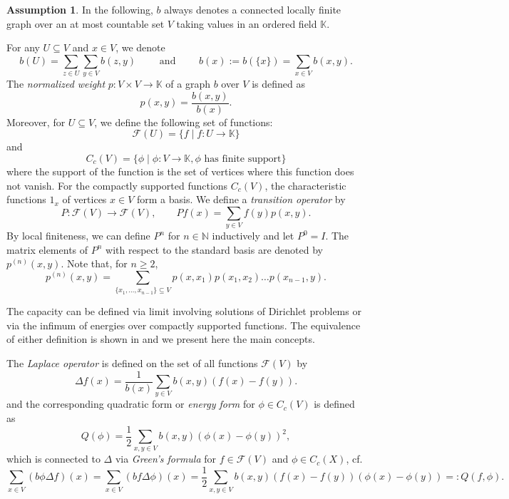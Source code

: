 \documentclass[a4paper,oneside, 12pt]{amsart}
\numberwithin{theorem}{section}
\theoremstyle{definition}
\newtheorem{assumption}[theorem]{Assumption}
\newcommand{\F}{\mathcal{F}}
\newcommand{\K}{\mathbb{K}}
\begin{document}
{\begin{assumption}
	In the following, $ b $ always denotes a connected locally finite graph over an at most countable set $ V $ taking values in an ordered field $ \mathbb{K} $.
\end{assumption}
For any $U\subseteq V$ and $ x\in V $, we denote
$$
b(U)=\sum_{z\in U}\sum_{y\in V}b(z,y) \qquad \mbox{ and }\qquad b(x):=b(\{x\})=\sum_{x\in V}b(x,y).
$$
The \emph{normalized weight} $p:V\times V\to \mathbb{K}$ of a graph $ b $ over $ V $ is defined as
\begin{equation*}
p(x,y)=\dfrac{b(x,y)}{b(x)}.
\end{equation*}
Moreover, for $ U\subseteq V $, we define the following set of functions:
$$
\F(U)=\{f \mid f:U\to \K\}
$$
and
$$
C_c(V)=\{\phi \mid \phi:V\to \K, \phi\mbox{ has finite support}\}
$$
where the support of the function is the set of vertices where this function does not vanish. For the compactly supported functions $ C_{c}(V) $, the
characteristic functions $ 1_{x} $ of vertices $ x\in V $ form a basis.
We define a\emph{ transition operator}  by
$$
P:\F(V)\to\F(V),\qquad Pf(x)=\sum_{y\in V} f(y)p(x,y).
$$
By local finiteness,  we can define $P^n$  for  $n\in \mathbb N$ inductively and let $P^0=I$. The matrix elements of $P^n$ with respect to the standard basis are denoted by $p^{(n)}(x,y)$. Note that, for $ n\ge 2 $,
$$
p^{(n)}(x,y) = \sum_{\{x_1,\ldots,x_{n-1}\}\subseteq V}p(x, x_1)p(x_1,x_2)\dots p(x_{n-1},y).
$$


The capacity can be defined via limit  involving solutions of Dirichlet problems or via the  infimum of energies over compactly supported functions. The equivalence of either definition  is shown in \cite{OurPreprint} and we present here the main concepts. 


The \emph{Laplace operator} is defined on the set of all functions $ \mathcal{F}(V) $
by
\begin{equation*}
\Delta f(x)=\dfrac{1}{b(x)}\sum_{y\in V}b(x,y)(f(x)-f(y)).
\end{equation*}
and the corresponding quadratic form or \emph{energy form} for $ \phi \in C_{c}(V)$ is defined as
\begin{equation*}
	Q(\phi)=\dfrac{1}{2}\sum_{x,y\in V}b(x,y)(\phi(x)-\phi(y))^2,
\end{equation*}
which is connected to $ \Delta $ via \emph{Green's formula} for $ f\in \mathcal{F} (V)$ and $ \phi\in C_{c}(X) $, cf. \cite[Theorem~22]{Muranova1}
$$
\sum_{x\in V}(b\phi\Delta f)(x)  =\sum_{x\in V} (bf\Delta \phi)(x) =\dfrac{1}{2}\sum_{x,y\in V}b(x,y)(f(x)-f(y))(\phi(x)-\phi(y))=:Q(f,\phi).
$$


}
\end{document}
